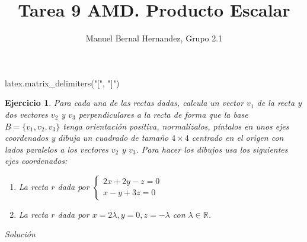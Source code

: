 \documentclass{amsart}
\title{Tarea 9 AMD. Producto Escalar}
\author{Manuel Bernal Hernandez, Grupo 2.1}
\newtheorem{ejer}{Ejercicio}
\begin{document}
\maketitle

\begin{sagecode}
latex.matrix_delimiters("[", "]")
\end{sagecode}

\begin{ejer}
Para cada una de las rectas dadas, calcula un vector $v_1$ de la recta y dos vectores 
$v_2$ y $v_3$ perpendiculares a la recta de forma que la base $B = \{v_1,v_2,v_3\}$ tenga 
orientación positiva, normalízalos, píntalos en unos ejes coordenados y dibuja un cuadrado de 
tamaño $4\times 4$ centrado en el origen con lados paralelos a los vectores $v_2$ y $v_3$.
Para hacer los dibujos usa los siguientes ejes coordenados:

\begin{sagesub}
\begin{center}
\end{center}
\end{sagesub}


\begin{enumerate}
\item La recta $r$ dada por $\begin{cases} 2x+2y-z = 0 \\ x-y+3z = 0 \end{cases} $
\item La recta $r$ dada por $x = 2\lambda, y = 0, z = -\lambda$ con $\lambda \in {\mathbb R}$.
\end{enumerate}
\end{ejer}

{\it Solución}
\end{document}
